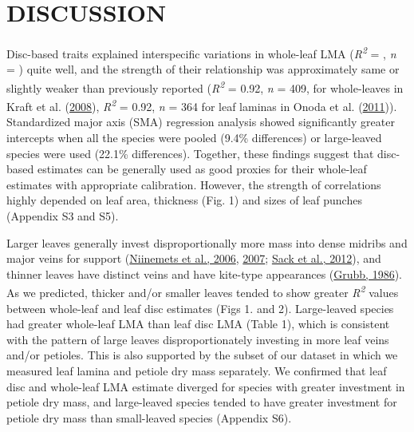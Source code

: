 \documentclass[
  12pt,
  a4paper,
,tablecaptionabove
]{scrartcl}
\begin{document}
\hypertarget{discussion}{%
\section{DISCUSSION}\label{discussion}}

Disc-based traits explained interspecific variations in whole-leaf LMA (\emph{R\textsuperscript{2}} = , \emph{n} = ) quite well, and the strength of their relationship was approximately same or slightly weaker than previously reported (\emph{R\textsuperscript{2}} = 0.92, \emph{n} = 409, for whole-leaves in Kraft et al. (\protect\hyperlink{ref-Kraft2008}{2008}), \emph{R\textsuperscript{2}} = 0.92, \emph{n} = 364 for leaf laminas in Onoda et al. (\protect\hyperlink{ref-Onoda2011}{2011})).
Standardized major axis (SMA) regression analysis showed significantly greater intercepts when all the species were pooled (9.4\% differences) or large-leaved species were used (22.1\% differences).
Together, these findings suggest that disc-based estimates can be generally used as good proxies for their whole-leaf estimates with appropriate calibration.
However, the strength of correlations highly depended on leaf area, thickness (Fig. 1) and sizes of leaf punches (Appendix S3 and S5).

Larger leaves generally invest disproportionally more mass into dense midribs and major veins for support (\protect\hyperlink{ref-Niinemets2006}{Niinemets et al., 2006}, \protect\hyperlink{ref-Niinemets2007}{2007}; \protect\hyperlink{ref-Sack2012}{Sack et al., 2012}), and thinner leaves have distinct veins and have kite-type appearances (\protect\hyperlink{ref-Grubb1986}{Grubb, 1986}).
As we predicted, thicker and/or smaller leaves tended to show greater \emph{R\textsuperscript{2}} values between whole-leaf and leaf disc estimates (Figs 1. and 2).
Large-leaved species had greater whole-leaf LMA than leaf disc LMA (Table 1), which is consistent with the pattern of large leaves disproportionately investing in more leaf veins and/or petioles.
This is also supported by the subset of our dataset in which we measured leaf lamina and petiole dry mass separately.
We confirmed that leaf disc and whole-leaf LMA estimate diverged for species with greater investment in petiole dry mass, and large-leaved species tended to have greater investment for petiole dry mass than small-leaved species (Appendix S6).
\end{document}
